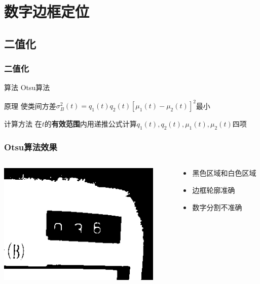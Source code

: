\documentclass[12pt,hyperref={CJKbookmarks=true}]{beamer}
\begin{document}
\section{数字边框定位}

\subsection{二值化}


\begin{frame}
  \frametitle{二值化}
  \begin{block}{算法}
    Otsu算法
  \end{block}
  \begin{block}{原理}
    使类间方差$\sigma_B^2(t)=q_1(t)q_2(t)[\mu_1(t)-\mu_2(t)]^2$最小
  \end{block}
  \begin{block}{计算方法}
    在$t$的\textbf{有效范围}内用递推公式计算$q_1(t),q_2(t),\mu_1(t),\mu_2(t)$四项
  \end{block}
\end{frame}

\begin{frame}
  \frametitle{Otsu算法效果}
  \begin{columns}[onlytextwidth]
    \begin{column}{0.5\textwidth}
      \centering
      \includegraphics[width=0.9\textwidth]{otsu.png}
    \end{column}
    \begin{column}{0.5\textwidth}
      \begin{itemize}
      \item 黑色区域和白色区域
      \item 边框轮廓准确
      \item 数字分割不准确
      \end{itemize}
    \end{column}
  \end{columns}
\end{frame}
\end{document}
